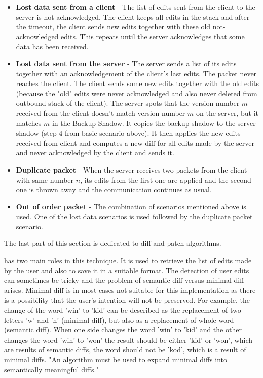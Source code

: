 \documentclass[12pt,oneside]{fithesis2}
\begin{document}
\begin{itemize}
\item \textbf{Lost data sent from a client} - The list of edits sent from the client to the server is not acknowledged. The client keeps all edits in the stack and after the timeout, the client sends new edits together with these old not-acknowledged edits. This repeats until the server acknowledges that some data has been received.
\item \textbf{Lost data sent from the server} - The server sends a list of its edits together with an acknowledgement of the client's last edits. The packet never reaches the client. The client sends some new edits together with the old edits (because the "old" edits were never acknowledged and also never deleted from outbound stack of the client). The server spots that the version number \(m\) received from the client doesn't match version number \(m\) on the server, but it matches \(m\) in the Backup Shadow. It copies the backup shadow to the server shadow (step 4 from basic scenario above). It then applies the new edits received from client and computes a new diff for all edits made by the server and never acknowledged by the client and sends it.
\item \textbf{Duplicate packet} - When the server receives two packets from the client with same number \(n\), its edits from the first one are applied and the second one is thrown away and the communication continues as usual.
\item \textbf{Out of order packet} - The combination of scenarios mentioned above is used. One of the lost data scenarios is used followed by the duplicate packet scenario.\cite{Fraser} 
\end{itemize}
\par The last part of this section is dedicated to diff and patch algorithms. 
\par \underline{} has two main roles in this technique. It is used to retrieve the list of edits made by the user and also to save it in a suitable format. The detection of user edits can sometimes be tricky and the problem of semantic diff versus minimal diff arises. Minimal diff is in most cases not suitable for this implementation as there is a possibility that the user's intention will not be preserved. For example, the change of the word 'win' to 'kid' can be described as the replacement of two letters 'w' and 'n' (minimal diff), but also as a replacement of whole word (semantic diff). When one side changes the word 'win' to 'kid' and the other changes the word 'win' to 'won' the result should be either 'kid' or 'won', which are results of semantic diffs, the word should not be 'kod', which is a result of minimal diffs. "An algorithm must be used to expand minimal diffs into semantically meaningful diffs." \cite{Fraser}
\end{document}
